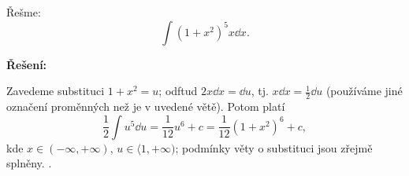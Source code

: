 \begin{mdframed}[style=mdexam]
  \begin{example}\label{MAI:exam125} 
    Řešme: 
    \begin{equation*}
      \int(1+x^2)^5x\dd{x}.
    \end{equation*}

    \noindent\textbf{Řešení:}

    Zavedeme substituci \(1+x^2 = u\); odftud \(2x\dd{x} = \dd{u}\), tj.
    \(x\dd{x}=\frac{1}{2}\dd{u}\) (používáme jiné označení proměnných než je v uvedené větě). Potom
    platí 
    \begin{equation*}
      \frac{1}{2}\int u^5\dd{u} = \frac{1}{12}u^6 + c = \frac{1}{12}(1+x^2)^6 + c,
    \end{equation*}
    kde \(x\in(-\infty, +\infty)\), \(u\in\langle 1,+\infty)\); podmínky věty o substituci jsou
    zřejmě splněny. \cite[s.~261]{Brabec1989}. 
  \end{example}
\end{mdframed}